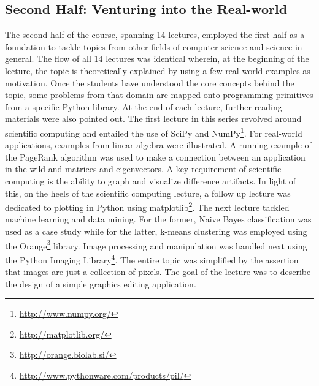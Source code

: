 \documentclass[letterpaper,twocolumn,10pt]{article}
\begin{document}
\subsection{Second Half: Venturing into the Real-world}
The second half of the course, spanning 14 lectures, employed the first half as
a foundation to tackle topics from other fields of computer science and science
in general. The flow of all 14 lectures was identical wherein, at the beginning
of the lecture, the topic is theoretically explained by using a few real-world
examples as motivation. Once the students have understood the core concepts
behind the topic, some problems from that domain are mapped onto programming
primitives from a specific Python library. At the end of each lecture, further
reading materials were also pointed out. The first lecture in this series
revolved around scientific computing and entailed the use of SciPy and
NumPy\footnote{\url{http://www.numpy.org/}}. For real-world applications,
examples from linear algebra were illustrated. A running example of the PageRank
algorithm was used to make a connection between an application in the wild and
matrices and eigenvectors. A key requirement of scientific computing is the
ability to graph and visualize difference artifacts. In light of this, on the
heels of the scientific computing lecture, a follow up lecture was dedicated to
plotting in Python using matplotlib\footnote{\url{http://matplotlib.org/}}.
The next lecture tackled machine learning and data mining. For the former, Naive
Bayes classification was used as a case study while for the latter, k-means
clustering was employed using the
Orange\footnote{\url{http://orange.biolab.si/}} library. Image processing and
manipulation was handled next using the Python Imaging
Library\footnote{\url{http://www.pythonware.com/products/pil/}}. The entire
topic was simplified by the assertion that images are just a collection of
pixels. The goal of the lecture was to describe the design of a simple graphics
editing application.
\end{document}

